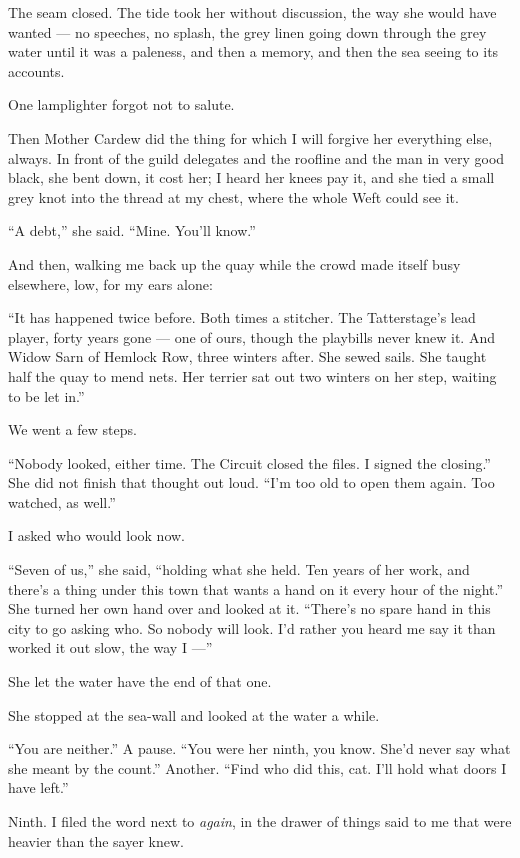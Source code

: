 The seam closed. The tide took her without discussion, the way she would have wanted --- no speeches, no splash, the grey linen going down through the grey water until it was a paleness, and then a memory, and then the sea seeing to its accounts.

One lamplighter forgot not to salute.

Then Mother Cardew did the thing for which I will forgive her everything else, always. In front of the guild delegates and the roofline and the man in very good black, she bent down, it cost her; I heard her knees pay it, and she tied a small grey knot into the thread at my chest, where the whole Weft could see it.

``A debt,'' she said. ``Mine. You'll know.''

And then, walking me back up the quay while the crowd made itself busy elsewhere, low, for my ears alone:

``It has happened twice before. Both times a stitcher. The Tatterstage's lead player, forty years gone --- one of ours, though the playbills never knew it. And Widow Sarn of Hemlock Row, three winters after. She sewed sails. She taught half the quay to mend nets. Her terrier sat out two winters on her step, waiting to be let in.''

We went a few steps.

``Nobody looked, either time. The Circuit closed the files. I signed the closing.'' She did not finish that thought out loud. ``I'm too old to open them again. Too watched, as well.''

I asked who would look now.

``Seven of us,'' she said, ``holding what she held. Ten years of her work, and there's a thing under this town that wants a hand on it every hour of the night.'' She turned her own hand over and looked at it. ``There's no spare hand in this city to go asking who. So nobody will look. I'd rather you heard me say it than worked it out slow, the way I ---''

She let the water have the end of that one.

She stopped at the sea-wall and looked at the water a while.

``You are neither.'' A pause. ``You were her ninth, you know. She'd never say what she meant by the count.'' Another. ``Find who did this, cat. I'll hold what doors I have left.''

Ninth. I filed the word next to \emph{again}, in the drawer of things said to me that were heavier than the sayer knew.


